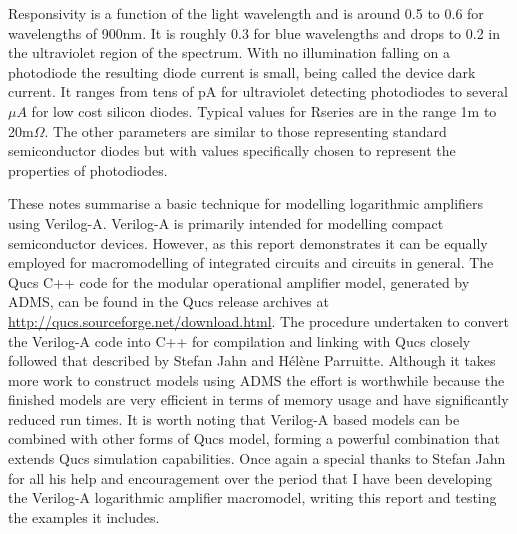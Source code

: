 Responsivity is a function of the light wavelength and is around 0.5
to 0.6 for wavelengths of 900nm. It is roughly 0.3 for blue
wavelengths and drops to 0.2 in the ultraviolet region of the
spectrum. With no illumination falling on a photodiode the resulting
diode current is small, being called the device dark current. It
ranges from tens of pA for ultraviolet detecting photodiodes to
several $\mu A$ for low cost silicon diodes. Typical values for
Rseries are in the range 1m to 20m$\Omega$.  The other parameters are
similar to those representing standard semiconductor diodes but with
values specifically chosen to represent the properties of photodiodes.


These notes summarise a basic technique for modelling logarithmic
amplifiers using Verilog-A.  Verilog-A is primarily intended for
modelling compact semiconductor devices.  However, as this report
demonstrates it can be equally employed for macromodelling of
integrated circuits and circuits in general. The Qucs C++ code for the
modular operational amplifier model, generated by ADMS, can be found
in the Qucs release archives at
\url{http://qucs.sourceforge.net/download.html}.  The procedure
undertaken to convert the Verilog-A code into C++ for compilation and
linking with Qucs closely followed that described by Stefan Jahn and
H\'{e}l\`{e}ne Parruitte.  Although it takes more work to construct
models using ADMS the effort is worthwhile because the finished models
are very efficient in terms of memory usage and have significantly
reduced run times. It is worth noting that Verilog-A based models can
be combined with other forms of Qucs model, forming a powerful
combination that extends Qucs simulation capabilities. Once again a
special thanks to Stefan Jahn for all his help and encouragement over
the period that I have been developing the Verilog-A logarithmic
amplifier macromodel, writing this report and testing the examples it
includes.
